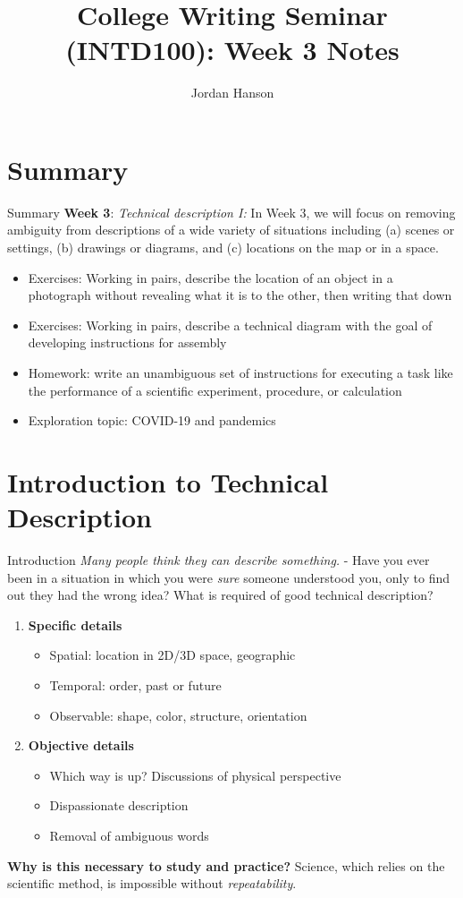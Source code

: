 \documentclass{beamer}
\title{College Writing Seminar (INTD100): Week 3 Notes}
\author{Jordan Hanson}
\institute{Whittier College Department of Physics and Astronomy}
\begin{document}
\maketitle

\section{Summary}

\begin{frame}{Summary}
\textbf{Week 3}: \textit{Technical description I:} In Week 3, we will focus on removing ambiguity from descriptions of a wide variety of situations including (a) scenes or settings, (b) drawings or diagrams, and (c) locations on the map or in a space.
\begin{itemize}
\item Exercises: Working in pairs, describe the location of an object in a photograph without revealing what it is to the other, then writing that down
\item Exercises: Working in pairs, describe a technical diagram with the goal of developing instructions for assembly
\item Homework: write an unambiguous set of instructions for executing a task like the performance of a scientific experiment, procedure, or calculation
\item Exploration topic: COVID-19 and pandemics
\end{itemize}
\end{frame}

\section{Introduction to Technical Description}

\begin{frame}{Introduction}
\textit{\alert{Many people think they can describe something.}} - Have you ever been in a situation in which you were \textit{sure} someone understood you, only to find out they had the wrong idea?  What is required of good technical description?
\begin{enumerate}
\item \textbf{Specific details}
\begin{itemize}
\item Spatial: location in 2D/3D space, geographic
\item Temporal: order, past or future
\item Observable: shape, color, structure, orientation
\end{itemize}
\item \textbf{Objective details}
\begin{itemize}
\item Which way is up? Discussions of physical perspective
\item Dispassionate description
\item Removal of ambiguous words
\end{itemize}
\end{enumerate}
\textbf{Why is this necessary to study and practice?} Science, which relies on the scientific method, is impossible without \textit{repeatability}.
\end{frame}
\end{document}
